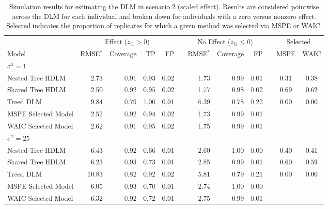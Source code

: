 \documentclass[12pt]{article}
\begin{document}
\begin{table}[!ht]
 \scriptsize
    \centering
    \caption{Simulation results for estimating the DLM in scenario 2 (scaled effect). Results are considered pointwise across the DLM for each individual and broken down for individuals with a zero versus nonzero effect. Selected indicates the proportion of replicates for which a given method was selected via MSPE or WAIC.}\vspace{6pt}
    \label{tab:scen2_res}
    \begin{tabular}{lrrrrrrrrrcc}
        \toprule[2pt]
        &\multicolumn{4}{c}{Effect ($z_{i1}>0$)}&&\multicolumn{3}{c}{No Effect ($z_{i1}\leq0$)}&&\multicolumn{2}{c}{Selected}\\
        \cmidrule(lr){2-5} \cmidrule(lr){7-9} \cmidrule(lr){11-12}
        Model & RMSE$^*$ & Coverage & TP & FP & \phantom{a} &RMSE$^*$ & Coverage & FP && MSPE & WAIC\\
        \midrule
        \multicolumn{9}{l}{$\sigma^2=1$}\\
      Nested Tree HDLM & 2.73 & 0.91 & 0.93 & 0.02 &  & 1.73 & 0.99 & 0.01 &  & 0.31 & 0.38\\
      Shared Tree HDLM & 2.50 & 0.92 & 0.95 & 0.02 &  & 1.77 & 0.98 & 0.02 &  & 0.69 & 0.62\\
             Treed DLM & 9.84 & 0.79 & 1.00 & 0.01 &  & 6.39 & 0.78 & 0.22 &  & 0.00 & 0.00\\
\addlinespace
MSPE Selected Model & 2.52 & 0.92 & 0.94 & 0.02 &  & 1.73 & 0.99 & 0.01 &  \\
WAIC Selected Model & 2.62 & 0.91 & 0.95 & 0.02 &  & 1.75 & 0.99 & 0.01 &  \\
        \midrule
        
        
        \multicolumn{9}{l}{$\sigma^2=25$}\\
              Nested Tree HDLM & 6.43 & 0.92 & 0.66 & 0.01 &  & 2.60 & 1.00 & 0.00 &  & 0.40 & 0.41\\
      Shared Tree HDLM & 6.23 & 0.93 & 0.73 & 0.01 &  & 2.85 & 0.99 & 0.01 &  & 0.60 & 0.59\\
            Treed DLM & 10.83 & 0.82 & 0.92 & 0.02 &  & 5.81 & 0.79 & 0.21 &  & 0.00 & 0.00\\
\addlinespace
MSPE Selected Model & 6.05 & 0.93 & 0.70 & 0.01 &  & 2.74 & 1.00 & 0.00 &  \\
WAIC Selected Model & 6.32 & 0.92 & 0.72 & 0.01 &  & 2.75 & 0.99 & 0.01 &  \\
        

\end{tabular}
\end{table}
\end{document}
